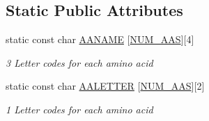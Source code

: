 \subsection*{Static Public Attributes}
\begin{DoxyCompactItemize}
\item 
static const char \hyperlink{classAA_a979027b32adbcc9f5eabeaf580d243b6}{A\-A\-N\-A\-M\-E} \mbox{[}\hyperlink{pdb_8h_aaa82008f92b935630ccf49c27a4bcc6e}{N\-U\-M\-\_\-\-A\-A\-S}\mbox{]}\mbox{[}4\mbox{]}
\begin{DoxyCompactList}\small\item\em 3 Letter codes for each amino acid \end{DoxyCompactList}\item 
static const char \hyperlink{classAA_ad31fab7fcd16661c068535ca46524a6a}{A\-A\-L\-E\-T\-T\-E\-R} \mbox{[}\hyperlink{pdb_8h_aaa82008f92b935630ccf49c27a4bcc6e}{N\-U\-M\-\_\-\-A\-A\-S}\mbox{]}\mbox{[}2\mbox{]}
\begin{DoxyCompactList}\small\item\em 1 Letter codes for each amino acid \end{DoxyCompactList}\end{DoxyCompactItemize}


